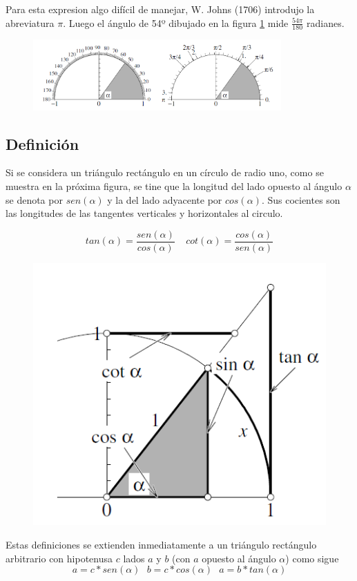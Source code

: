 \documentclass[a4paper,10pt,BCOR10mm,oneside,headsepline]{scrbook}
\begin{document}
Para esta expresion algo difícil de manejar, W. Johns (1706) introdujo la abreviatura $\pi$. Luego el ángulo de 54º dibujado en la figura \ref{fig:ejemplo} mide $\frac{54\pi}{180}$ radianes.

\begin{figure}[h!]
  \centering
    \includegraphics[width=95mm]{grados.png}
  \label{fig:ejemplo}
\end{figure}

\subsection{Definición}

Si se considera un triángulo rectángulo en un círculo de radio uno, como se muestra en la próxima figura, se tine que la longitud del lado opuesto al ángulo $\alpha$ se denota por $sen(\alpha)$ y la del lado adyacente por $cos(\alpha)$. Sus cocientes son las longitudes de las tangentes verticales y horizontales al circulo. 


\[tan(\alpha)=\frac{sen(\alpha)}{cos(\alpha)} \ \ \ \ \ cot(\alpha)=\frac{cos(\alpha)}{sen(\alpha)}\]

\begin{figure}[h!]
\centering
    \includegraphics[width=0.35\linewidth]{trigonometria.png}
  \label{fig:ejemplo1}
\end{figure}






Estas definiciones se extienden inmediatamente a un triángulo rectángulo arbitrario con hipotenusa $c$ lados $a$ y $b$ (con $a$ opuesto al ángulo $\alpha$) como sigue 
\[ a=c*sen(\alpha)\ \ \ b=c*cos(\alpha) \ \ \
a=b*tan(\alpha) \]
\end{document}
